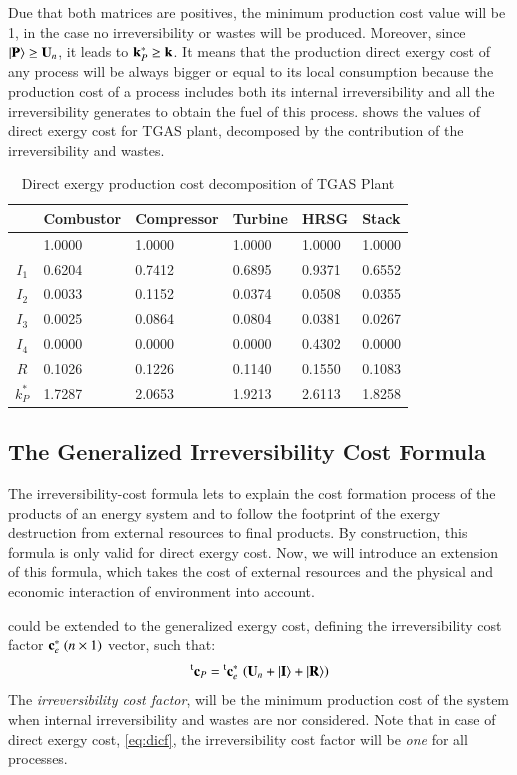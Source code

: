 \documentclass{ecos2018}
\begin{document}
Due that both matrices are positives, the minimum production cost value will be 1, in  the case no irreversibility or wastes will be produced. Moreover, since $\left| {\textbf{P} } \right\rangle\ge\mathbf{U}_n$, it leads to $\mathbf{k}_P^*\ge\mathbf{k}$.
It means that the production direct exergy cost of any process will be always bigger or equal to its local consumption because the production cost of a process includes both its internal irreversibility and all the irreversibility generates to obtain the fuel of this process.  shows the values of direct exergy cost for TGAS plant, decomposed by the contribution of the irreversibility and wastes.
\begin{table}[htbp]
	\caption{Direct exergy production cost decomposition of TGAS Plant}
	\begin{tabularx}{0.8\textwidth}{cZZZZZ}
		\addlinespace
		\toprule
		& Combustor & Compressor & Turbine & HRSG  & Stack \\
		\midrule
		& 1.0000 & 1.0000 & 1.0000 & 1.0000 & 1.0000 \\
		\midrule
		$I_1$ & 0.6204 & 0.7412 & 0.6895 & 0.9371 & 0.6552 \\
		$I_2$ & 0.0033 & 0.1152 & 0.0374 & 0.0508 & 0.0355 \\
		$I_3$ & 0.0025 & 0.0864 & 0.0804 & 0.0381 & 0.0267 \\
		$I_4$ & 0.0000 & 0.0000 & 0.0000 & 0.4302 & 0.0000 \\
		$R$   & 0.1026 & 0.1226 & 0.1140 & 0.1550 & 0.1083 \\
		\midrule
		$k_P^*$& 1.7287 & 2.0653 & 1.9213 & 2.6113 & 1.8258 \\
		\bottomrule
	\end{tabularx}
	\label{tab3}
\end{table}

\subsection{The Generalized Irreversibility Cost Formula}
The irreversibility-cost formula lets to explain the cost formation process of the products of an energy system and to follow the footprint of the exergy destruction from external resources to final products. By construction, this formula is only valid for direct exergy cost. Now, we will introduce an extension of this formula, which takes the cost of external resources and the physical and economic interaction of environment into account.

 could be extended to the generalized exergy cost, defining the irreversibility cost factor $\mathbf{c}_{e}^{*}\;(n\times1)$  vector, such that:
\begin{equation}
\prescript{\smash{\mathrm{t}}}{}{\mathbf{c}}_P=\prescript{\smash{\mathrm{t}}}{}{\mathbf{c}}_{e}^{*}\,\left(\mathbf{U}_n+\left| {\textbf{I} } \right\rangle+\left| {\textbf{R} } \right\rangle\right)
\end{equation}
The \emph{irreversibility cost factor}, will be the minimum production cost of the system when  internal irreversibility and wastes are nor considered. Note that in case of direct exergy cost, \cref{eq:dicf}, the irreversibility cost factor will be \emph{one} for all processes.
\end{document}
